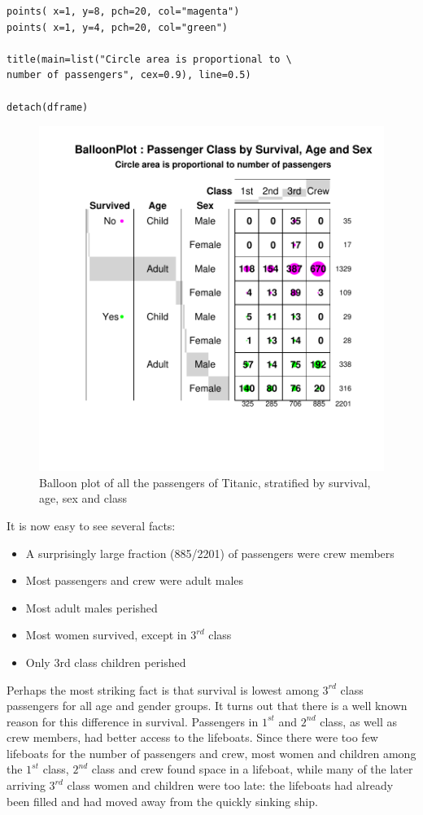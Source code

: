 \documentclass[a4paper]{report}
\begin{document}
\begin{article}
{\begin{verbatim}
points( x=1, y=8, pch=20, col="magenta")
points( x=1, y=4, pch=20, col="green")

title(main=list("Circle area is proportional to \
number of passengers", cex=0.9), line=0.5)

detach(dframe)
\end{verbatim}
 }

\begin{figure}
\includegraphics[width=\textwidth]{Figure4.pdf}
\caption{\label{figure:Figure4}
Balloon plot of all the passengers of Titanic, stratified by survival,
age, sex and class}
\end{figure}

It is now easy to see several facts:
\begin{itemize}
\item A surprisingly large fraction (885/2201) of passengers were crew
      members
\item Most passengers and crew were adult males 
\item Most adult males perished
\item Most women survived, except in $3^{rd}$ class
\item Only 3rd class children perished
\end{itemize}

Perhaps the most striking fact is that survival is lowest among
$3^{rd}$ class passengers for all age and gender groups.  It turns out
that there is a well known reason for this difference in survival.
Passengers in $1^{st}$ and $2^{nd}$ class, as well as crew members,
had better access to the lifeboats.  Since there were too few
lifeboats for the number of passengers and crew, most women and
children among the $1^{st}$ class, $2^{nd}$ class and crew found space
in a lifeboat, while many of the later arriving $3^{rd}$ class women
and children were too late: the lifeboats had already been filled and
had moved away from the quickly sinking ship.


\end{article}
\end{document}
